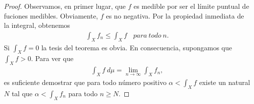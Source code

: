 \begin{proof}
    Observamos, en primer lugar, que $f$ es medible por ser el límite puntual de fuciones medibles. Obviamente, $f$ es no negativa. Por la propiedad inmediata de la integral, obtenemos
    \begin{align*}
        \int_{X}{f_n} \leq \int_{X}{f} \ \ \ \ para \ todo \ n.
    \end{align*}
    Si $\int_{X}{f} = 0$ la tesis del teorema es obvia. En consecuencia, supongamos que $\int_{X}{f} > 0$. Para ver que
    \begin{align*}
        \int_{X}{f \ d\mu} = \lim_{n \to \infty}{\int_{X}{f_n}},
    \end{align*}
    es suficiente demostrar que para todo número positivo $\alpha < \int_{X}{f}$ existe un natural $N$ tal que $\alpha < \int_{X}{f_n}$ para todo $n \ge N$.


\end{proof}
